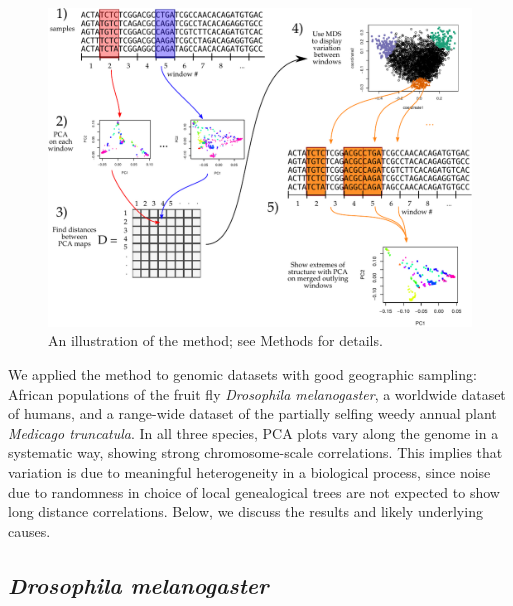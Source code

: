 \documentclass[11pt, oneside]{article}   	%
\begin{document}
\begin{figure}
    \begin{center}
       \includegraphics{the-method-diagram}
    \end{center}
    \caption{
         An illustration of the method; see Methods for details.
         \label{fig:diagram}
    }
\end{figure}

We applied the method to genomic datasets with good geographic sampling:
African populations of the fruit fly \textit{Drosophila melanogaster},
a worldwide dataset of humans,
and a range-wide dataset of the partially selfing weedy annual plant \textit{Medicago truncatula}.
In all three species, PCA plots vary along the genome in a systematic way, showing strong chromosome-scale correlations.
This implies that variation is due to meaningful heterogeneity in a biological process,
since noise due to randomness in choice of local genealogical trees
are not expected to show long distance correlations. 
Below, we discuss the results and likely underlying causes.


\subsection{\textit{Drosophila melanogaster}}
\end{document}
